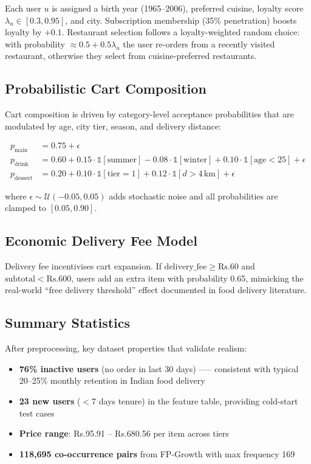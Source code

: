 \documentclass[conference]{IEEEtran}
\newcommand{\rupee}{Rs.}
\begin{document}
Each user $u$ is assigned a birth year (1965--2006), preferred cuisine,
loyalty score $\lambda_u \in [0.3, 0.95]$, and city. Subscription membership
(35\% penetration) boosts loyalty by $+0.1$. Restaurant selection follows
a loyalty-weighted random choice: with probability $\approx 0.5 + 0.5\lambda_u$
the user re-orders from a recently visited restaurant, otherwise they select
from cuisine-preferred restaurants.

\subsection{Probabilistic Cart Composition}

Cart composition is driven by category-level acceptance probabilities that are
modulated by age, city tier, season, and delivery distance:

\begin{align}
  p_\text{main}    &= 0.75 + \epsilon \\
  p_\text{drink}   &= 0.60 + 0.15 \cdot \mathbb{1}[\text{summer}]
                         - 0.08 \cdot \mathbb{1}[\text{winter}]
                         + 0.10 \cdot \mathbb{1}[\text{age} < 25]
                         + \epsilon \\
  p_\text{dessert} &= 0.20 + 0.10 \cdot \mathbb{1}[\text{tier}=1]
                         + 0.12 \cdot \mathbb{1}[d > 4\,\text{km}]
                         + \epsilon
\end{align}

where $\epsilon \sim \mathcal{U}(-0.05, 0.05)$ adds stochastic noise and all
probabilities are clamped to $[0.05, 0.90]$.

\subsection{Economic Delivery Fee Model}

Delivery fee incentivises cart expansion. If $\text{delivery\_fee} \geq
\text{\rupee}60$ and $\text{subtotal} < \text{\rupee}600$, users add an extra
item with probability 0.65, mimicking the real-world ``free delivery
threshold'' effect documented in food delivery literature.

\subsection{Summary Statistics}

After preprocessing, key dataset properties that validate realism:
\begin{itemize}
  \item \textbf{76\% inactive users} (no order in last 30 days) -----
        consistent with typical 20--25\% monthly retention in Indian food delivery
  \item \textbf{23 new users} ($<$7 days tenure) in the feature table,
        providing cold-start test cases
  \item \textbf{Price range}: \rupee95.91 -- \rupee680.56 per item across tiers
  \item \textbf{118,695 co-occurrence pairs} from FP-Growth with max frequency 169
\end{itemize}
\end{document}
